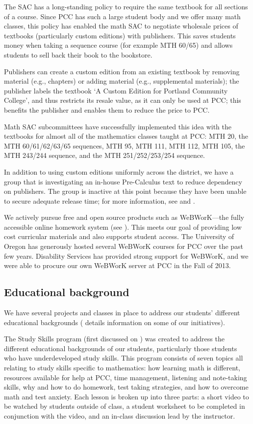 The SAC has a long-standing policy to require the same textbook for all
sections of a course. Since PCC has such a large student body and we offer many
math classes, this policy has enabled the math SAC to negotiate wholesale
prices of textbooks (particularly custom editions) with publishers.  This saves
students money when taking a sequence course (for example MTH 60/65) and allows
students to sell back their book to the bookstore.

Publishers can create a custom edition from an existing textbook by removing
material (e.g., chapters) or adding material (e.g., supplemental materials);
the publisher labels the textbook `A Custom Edition for Portland Community
College', and thus restricts its resale value, as it can only be used at PCC;
this benefits the publisher and enables them to reduce the price to PCC.

Math SAC subcommittees have successfully implemented this idea with the
textbooks for almost all of the mathematics classes taught at PCC: MTH 20, the
MTH 60/61/62/63/65 sequences, MTH 95, MTH 111, MTH 112, MTH 105, the MTH 243/244
sequence, and the MTH 251/252/253/254 sequence.

In addition to using custom editions uniformly across the district, we have a
group that is investigating an in-house Pre-Calculus text to reduce dependency
on publishers. The group is inactive at this point because they have been
unable to secure adequate release time; for more information, see
 and \cite{mth111project}.

We actively pursue free and open source products such as WeBWorK---the fully
accessible online homework system (see ). This
meets our goal of providing low cost curricular materials and also supports
student access. The University of Oregon has generously hosted several WeBWorK
courses for PCC over the past few years.  Disability Services has provided
strong support for WeBWorK, and we were able to procure our own WeBWorK server
at PCC in the Fall of 2013.

\subsection{Educational background}
We have several projects and classes in place to address our students'
different educational backgrounds ( details information on
some of our initiatives).

The Study Skills program (first discussed on ) was created to address the different educational
backgrounds of our students, particularly those students who have
underdeveloped study skills. This program consists of seven topics all relating
to study skills specific to mathematics: how learning math is different,
resources available for help at PCC, time management, listening and note-taking
skills, why and how to do homework, test taking strategies, and how to overcome
math and test anxiety.  Each lesson is broken up into three parts: a short
video to be watched by students outside of class, a student worksheet to be
completed in conjunction with the video, and an in-class discussion lead by the
instructor.

